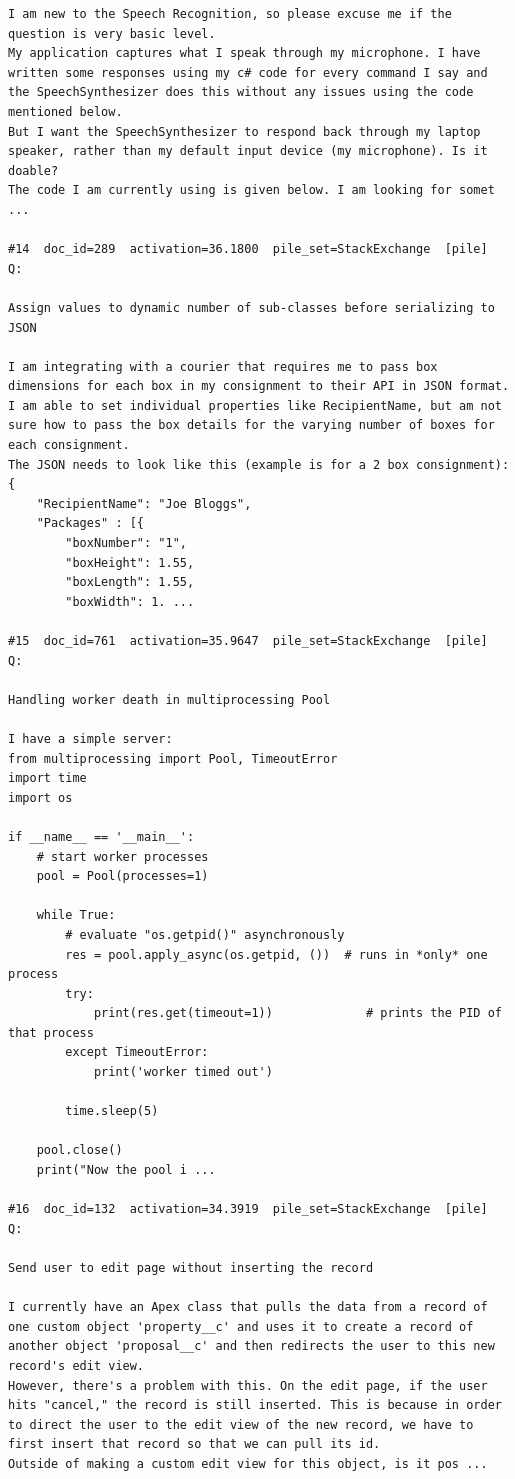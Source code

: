 \begin{verbatim}
I am new to the Speech Recognition, so please excuse me if the question is very basic level. 
My application captures what I speak through my microphone. I have written some responses using my c# code for every command I say and the SpeechSynthesizer does this without any issues using the code mentioned below.
But I want the SpeechSynthesizer to respond back through my laptop speaker, rather than my default input device (my microphone). Is it doable?
The code I am currently using is given below. I am looking for somet ...

#14  doc_id=289  activation=36.1800  pile_set=StackExchange  [pile]
Q:

Assign values to dynamic number of sub-classes before serializing to JSON

I am integrating with a courier that requires me to pass box dimensions for each box in my consignment to their API in JSON format. I am able to set individual properties like RecipientName, but am not sure how to pass the box details for the varying number of boxes for each consignment.
The JSON needs to look like this (example is for a 2 box consignment):
{
    "RecipientName": "Joe Bloggs",
    "Packages" : [{
        "boxNumber": "1",
        "boxHeight": 1.55,  
        "boxLength": 1.55,
        "boxWidth": 1. ...

#15  doc_id=761  activation=35.9647  pile_set=StackExchange  [pile]
Q:

Handling worker death in multiprocessing Pool

I have a simple server:
from multiprocessing import Pool, TimeoutError
import time
import os

if __name__ == '__main__':
    # start worker processes
    pool = Pool(processes=1)

    while True:
        # evaluate "os.getpid()" asynchronously
        res = pool.apply_async(os.getpid, ())  # runs in *only* one process
        try:
            print(res.get(timeout=1))             # prints the PID of that process
        except TimeoutError:
            print('worker timed out')

        time.sleep(5)

    pool.close()
    print("Now the pool i ...

#16  doc_id=132  activation=34.3919  pile_set=StackExchange  [pile]
Q:

Send user to edit page without inserting the record

I currently have an Apex class that pulls the data from a record of one custom object 'property__c' and uses it to create a record of another object 'proposal__c' and then redirects the user to this new record's edit view.
However, there's a problem with this. On the edit page, if the user hits "cancel," the record is still inserted. This is because in order to direct the user to the edit view of the new record, we have to first insert that record so that we can pull its id.
Outside of making a custom edit view for this object, is it pos ...


\end{verbatim}
